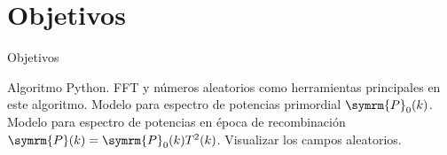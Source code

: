 \section{Objetivos}
\begin{frame}[noframenumbering]{Objetivos}
    \begin{itemize}
        \okitem Algoritmo Python.
        \okitem FFT y números aleatorios como herramientas principales en este algoritmo.
        \okitem Modelo para espectro de potencias primordial \(\symrm{P}_0(k)\).
        \okitem Modelo para espectro de potencias en época de recombinación \(\symrm{P}(k)=\symrm{P}_0(k)T^2(k)\).
        \okitem Visualizar los campos aleatorios.
    \end{itemize}
\end{frame}